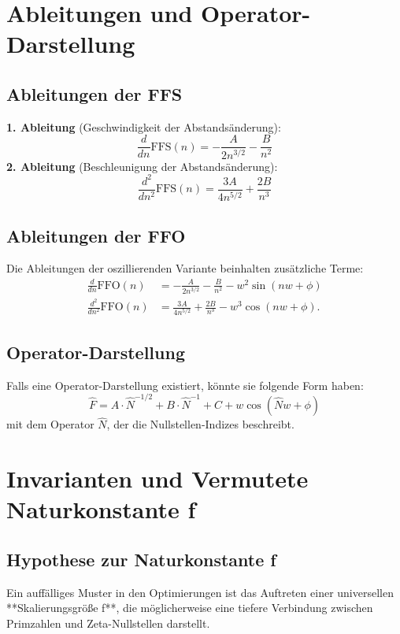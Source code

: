 \documentclass[a4paper,12pt]{article}
\begin{document}
\section{Ableitungen und Operator-Darstellung}
\subsection{Ableitungen der FFS}
\textbf{1. Ableitung} (Geschwindigkeit der Abstandsänderung):
\begin{equation}
    \frac{d}{dn} \text{FFS}(n) = -\frac{A}{2 n^{3/2}} - \frac{B}{n^2}
\end{equation}
\textbf{2. Ableitung} (Beschleunigung der Abstandsänderung):
\begin{equation}
    \frac{d^2}{dn^2} \text{FFS}(n) = \frac{3A}{4 n^{5/2}} + \frac{2B}{n^3}
\end{equation}

\subsection{Ableitungen der FFO}
Die Ableitungen der oszillierenden Variante beinhalten zusätzliche Terme:
\begin{align}
    \frac{d}{dn} \text{FFO}(n) &= -\frac{A}{2 n^{3/2}} - \frac{B}{n^2} - w^2 \sin(nw + \phi) \\
    \frac{d^2}{dn^2} \text{FFO}(n) &= \frac{3A}{4 n^{5/2}} + \frac{2B}{n^3} - w^3 \cos(nw + \phi).
\end{align}

\subsection{Operator-Darstellung}
Falls eine Operator-Darstellung existiert, könnte sie folgende Form haben:
\begin{equation}
    \hat{F} = A \cdot \hat{N}^{-1/2} + B \cdot \hat{N}^{-1} + C + w \cos(\hat{N} w + \phi)
\end{equation}
mit dem Operator $\hat{N}$, der die Nullstellen-Indizes beschreibt.

\section{Invarianten und Vermutete Naturkonstante f}
\subsection{Hypothese zur Naturkonstante f}
Ein auffälliges Muster in den Optimierungen ist das Auftreten einer universellen **Skalierungsgröße f**, die möglicherweise eine tiefere Verbindung zwischen Primzahlen und Zeta-Nullstellen darstellt.
\end{document}
